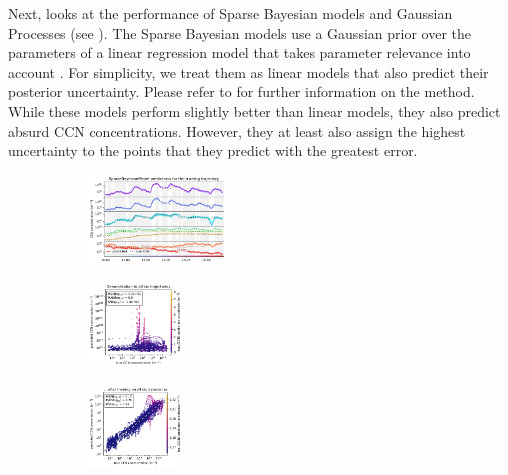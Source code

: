 \newpar Next,  looks at the performance of Sparse Bayesian models and Gaussian Processes (see ). The Sparse Bayesian models use a Gaussian prior over the parameters of a linear regression model that takes parameter relevance into account \cite{sparse-bayesian-1996}. For simplicity, we treat them as linear models that also predict their posterior uncertainty. Please refer to \textcite{sparse-bayesian-1996} for further information on the method. While these models perform slightly better than linear models, they also predict absurd CCN concentrations. However, they at least also assign the highest uncertainty to the points that they predict with the greatest error.

\begin{figure}[H]
    \begin{subfigure}
    \centering
    \includegraphics[width=0.4\textwidth]{prediction/figures/models/sparsebayesianmodel-training-prediction.pdf}
    \end{subfigure}
    \begin{subfigure}
    \centering
    \includegraphics[width=0.275\textwidth]{prediction/figures/models/sparsebayesianmodel-test-generalisation.pdf}
    \end{subfigure}
    \begin{subfigure}
    \centering
    \includegraphics[width=0.275\textwidth]{prediction/figures/models/sparsebayesianmodel-test-prediction.pdf}
    \end{subfigure}
   

\end{figure}
